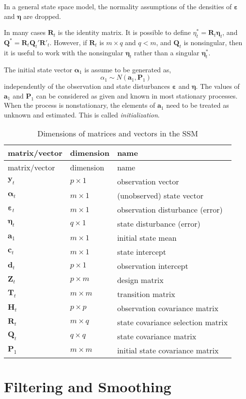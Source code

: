 \documentclass[]{book}
\newcommand{\mat}[1]{\boldsymbol{#1}}
\renewcommand{\vec}[1]{\boldsymbol{#1}}
\begin{document}
In a general state space model, the normality assumptions of the
densities of \(\vec{\varepsilon}\) and \(\vec{\eta}\) are dropped.

In many cases \(\mat{R}_t\) is the identity matrix. It is possible to
define \(\eta^*_t = \mat{R}_t \vec{\eta}_t\), and
\(\mat{Q}^* = \mat{R}_t \mat{Q}_t' \mat{R}'_t\). However, if
\(\mat{R}_t\) is \(m \times q\) and \(q < m\), and \(\mat{Q}_t\) is
nonsingular, then it is useful to work with the nonsingular
\(\vec{\eta}_t\) rather than a singular \(\vec{\eta}_t^*\).

The initial state vector \(\vec{\alpha}_1\) is assume to be generated
as, \[
\alpha_1 \sim N(\vec{a}_1, \mat{P}_1)
\] independently of the observation and state disturbances
\(\vec{\varepsilon}\) and \(\vec{\eta}\). The values of \(\vec{a}_1\)
and \(\mat{P}_1\) can be considered as given and known in most
stationary processes. When the process is nonstationary, the elements of
\(\vec{a}_1\) need to be treated as unknown and estimated. This is
called \emph{initialization}.

\begin{longtable}[]{@{}lll@{}}
\caption{Dimensions of matrices and vectors in the SSM}\tabularnewline
\toprule
matrix/vector & dimension & name\tabularnewline
\midrule
\endfirsthead
\toprule
matrix/vector & dimension & name\tabularnewline
\midrule
\endhead
\(\vec{y}_t\) & \(p \times 1\) & observation vector\tabularnewline
\(\vec{\alpha}_t\) & \(m \times 1\) & (unobserved) state
vector\tabularnewline
\(\vec{\varepsilon}_t\) & \(m \times 1\) & observation disturbance
(error)\tabularnewline
\(\vec{\eta}_t\) & \(q \times 1\) & state disturbance
(error)\tabularnewline
\(\vec{a}_1\) & \(m \times 1\) & initial state mean\tabularnewline
\(\vec{c}_t\) & \(m \times 1\) & state intercept\tabularnewline
\(\vec{d}_t\) & \(p \times 1\) & observation intercept\tabularnewline
\(\mat{Z}_t\) & \(p \times m\) & design matrix\tabularnewline
\(\mat{T}_t\) & \(m \times m\) & transition matrix\tabularnewline
\(\mat{H}_t\) & \(p \times p\) & observation covariance
matrix\tabularnewline
\(\mat{R}_t\) & \(m \times q\) & state covariance selection
matrix\tabularnewline
\(\mat{Q}_t\) & \(q \times q\) & state covariance matrix\tabularnewline
\(\mat{P}_1\) & \(m \times m\) & initial state covariance
matrix\tabularnewline
\bottomrule
\end{longtable}

\chapter{Filtering and Smoothing}\label{filtering-and-smoothing}
\end{document}
